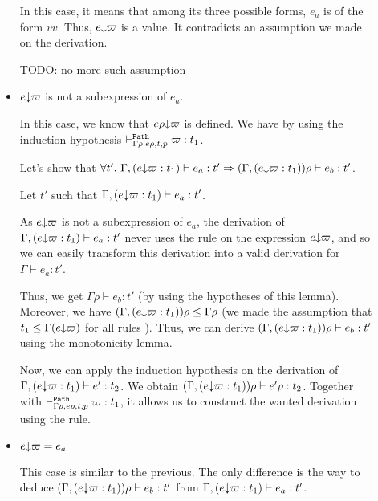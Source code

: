 \documentclass[a4paper]{article}
\theoremstyle{definition}
\begin{document}
\begin{description}
\begin{itemize}
            In this case, it means that among its three possible forms,
            $e_a$ is of the form $v v$. Thus, $\occ e \varpi$ is a value.
            It contradicts an assumption we made on the derivation.

            TODO: no more such assumption

            \item $\occ e \varpi$ is not a subexpression of $e_a$.
            
            In this case, we know that $\occ {e\rho} \varpi$ is defined.
            We have by using the induction hypothesis $\pvdash {\Gamma\rho} p {e\rho} t \varpi:t_1$.

            Let's show that $\forall t'.\ \Gamma,(\occ e \varpi:t_1) \vdash e_a : t' \Rightarrow (\Gamma,(\occ e \varpi:t_1))\rho \vdash e_b:t'$.
            
            Let $t'$ such that $\Gamma,(\occ e \varpi:t_1) \vdash e_a : t'$.

            As $\occ e \varpi$ is not a subexpression of $e_a$, the derivation of
            $\Gamma,(\occ e \varpi:t_1) \vdash e_a : t'$ never uses the rule  on the expression $\occ e \varpi$,
            and so we can easily transform this derivation into a valid derivation for $\Gamma \vdash e_a : t'$.
 
            Thus, we get $\Gamma\rho \vdash e_b : t'$ (by using the hypotheses of this lemma).
            Moreover, we have $(\Gamma,(\occ e \varpi:t_1))\rho \leq \Gamma\rho$
            (we made the assumption that $t_1 \leq \Gamma(\occ e \varpi)$ for all rules ).
            Thus, we can derive $(\Gamma,(\occ e \varpi:t_1))\rho\vdash e_b : t'$ using the monotonicity lemma.

            Now, we can apply the induction hypothesis on the derivation of $\Gamma,(\occ e \varpi:t_1) \vdash e' : t_2$.
            We obtain $(\Gamma,(\occ e \varpi:t_1))\rho \vdash e'\rho : t_2$.
            Together with $\pvdash {\Gamma\rho} p {e\rho} t \varpi:t_1$, it allows us to construct the wanted derivation using the
             rule.

            \item $\occ e \varpi = e_a$
            
            This case is similar to the previous.
            The only difference is the way to deduce $(\Gamma,(\occ e \varpi:t_1))\rho \vdash e_b:t'$ from $\Gamma,(\occ e \varpi:t_1) \vdash e_a : t'$.


\end{itemize}
\end{description}
\end{document}
